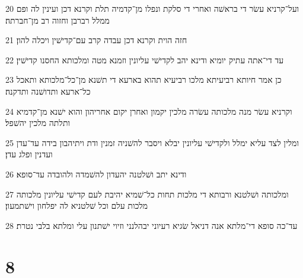 \par 20 ועל־קרניא עשׂר די בראשׁה ואחרי די סלקת ונפלו מן־קדמיה תלת וקרנא דכן ועינין לה ופם ממלל רברבן וחזוה רב מן־חברתה׃
\par 21 חזה הוית וקרנא דכן עבדה קרב עם־קדישׁין ויכלה להון׃
\par 22 עד די־אתה עתיק יומיא ודינא יהב לקדישׁי עליונין וזמנא מטה ומלכותא החסנו קדישׁין׃
\par 23 כן אמר חיותא רביעיתא מלכו רביעיא תהוא בארעא די תשׁנא מן־כל־מלכותא ותאכל כל־ארעא ותדושׁנה ותדקנה׃
\par 24 וקרניא עשׂר מנה מלכותה עשׂרה מלכין יקמון ואחרן יקום אחריהון והוא ישׁנא מן־קדמיא ותלתה מלכין יהשׁפל׃
\par 25 ומלין לצד עליא ימלל ולקדישׁי עליונין יבלא ויסבר להשׁניה זמנין ודת ויתיהבון בידה עד־עדן ועדנין ופלג עדן׃
\par 26 ודינא יתב ושׁלטנה יהעדון להשׁמדה ולהובדה עד־סופא׃
\par 27 ומלכותה ושׁלטנא ורבותא די מלכות תחות כל־שׁמיא יהיבת לעם קדישׁי עליונין מלכותה מלכות עלם וכל שׁלטניא לה יפלחון וישׁתמעון׃
\par 28 עד־כה סופא די־מלתא אנה דניאל שׂגיא רעיוני יבהלנני וזיוי ישׁתנון עלי ומלתא בלבי נטרת׃

\chapter{8}


